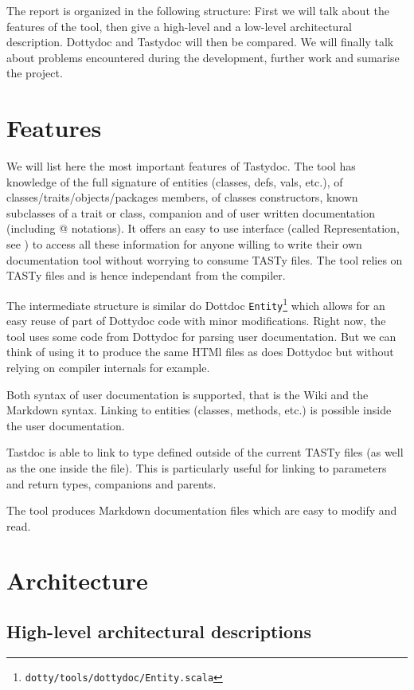 \documentclass{report}
\begin{document}
The report is organized in the following structure: First we will talk about the features of the tool, then give a high-level and a low-level architectural description. Dottydoc and Tastydoc will then be compared. We will finally talk about problems encountered during the development, further work and sumarise the project.

\chapter{Features}
We will list here the most important features of Tastydoc. The tool has knowledge of the full signature of entities (classes, defs, vals, etc.), of classes/traits/objects/packages members, of classes constructors, known subclasses of a trait or class, companion and of user written documentation (including @ notations). It offers an easy to use interface (called Representation, see ) to access all these information for anyone willing to write their own documentation tool without worrying to consume TASTy files. The tool relies on TASTy files and is hence independant from the compiler.

The intermediate structure is similar do Dottdoc \texttt{Entity}\footnote{\texttt{dotty/tools/dottydoc/Entity.scala}} which allows for an easy reuse of part of Dottydoc code with minor modifications. Right now, the tool uses some code from Dottydoc for parsing user documentation. But we can think of using it to produce the same HTMl files as does Dottydoc but without relying on compiler internals for example.

Both syntax of user documentation is supported, that is the Wiki and the Markdown syntax. Linking to entities (classes, methods, etc.) is possible inside the user documentation.

Tastdoc is able to link to type defined outside of the current TASTy files (as well as the one inside the file). This is particularly useful for linking to parameters and return types, companions and parents.

The tool produces Markdown documentation files which are easy to modify and read.

\chapter{Architecture}
\section{High-level architectural descriptions}
\end{document}
